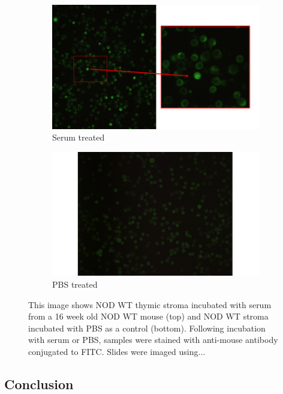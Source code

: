 \begin{figure}
	\begin{subfigure}{\textwidth}
		\includegraphics[width=\textwidth]{Figures/WTserum.png}
		\caption{Serum treated}
		\label{subfig:WTserum}
	\end{subfigure}
	\begin{subfigure}{\textwidth}
		\includegraphics[width=\textwidth]{Figures/WTcontrol.png}
		\caption{PBS treated}
		\label{subfig:WTcontrol}
	\end{subfigure}
\caption{This image shows NOD WT thymic stroma incubated with serum from a 16 week old NOD WT mouse (top) and NOD WT stroma incubated with PBS as a control (bottom).
Following incubation with serum or PBS, samples were stained with anti-mouse antibody conjugated to FITC.
Slides were imaged using...}
\label{fig:histology}
\end{figure}


\subsection{Conclusion}


